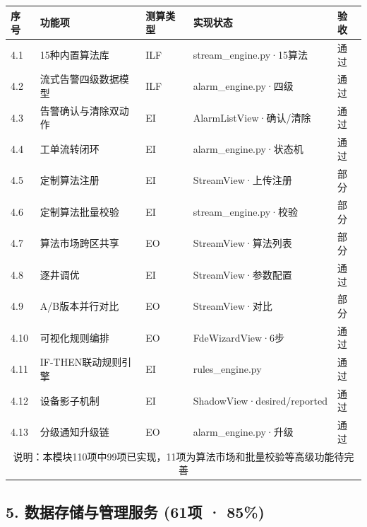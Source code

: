 \documentclass[11pt,a4paper]{ctexart}
\begin{document}
\begin{longtable}{p{1cm}p{4cm}p{3cm}p{3cm}p{2.5cm}}
\toprule
\textbf{序号} & \textbf{功能项} & \textbf{测算类型} & \textbf{实现状态} & \textbf{验收} \\
\midrule
4.1 & 15种内置算法库 & ILF & stream\_engine.py·15算法 & \color{ok}通过 \\
4.2 & 流式告警四级数据模型 & ILF & alarm\_engine.py·四级 & \color{ok}通过 \\
4.3 & 告警确认与清除双动作 & EI & AlarmListView·确认/清除 & \color{ok}通过 \\
4.4 & 工单流转闭环 & EI & alarm\_engine.py·状态机 & \color{ok}通过 \\
4.5 & 定制算法注册 & EI & StreamView·上传注册 & \color{warn}部分 \\
4.6 & 定制算法批量校验 & EI & stream\_engine.py·校验 & \color{warn}部分 \\
4.7 & 算法市场跨区共享 & EO & StreamView·算法列表 & \color{warn}部分 \\
4.8 & 逐井调优 & EI & StreamView·参数配置 & \color{ok}通过 \\
4.9 & A/B版本并行对比 & EO & StreamView·对比 & \color{warn}部分 \\
4.10 & 可视化规则编排 & EO & FdeWizardView·6步 & \color{ok}通过 \\
4.11 & IF-THEN联动规则引擎 & EI & rules\_engine.py & \color{ok}通过 \\
4.12 & 设备影子机制 & EI & ShadowView·desired/reported & \color{ok}通过 \\
4.13 & 分级通知升级链 & EO & alarm\_engine.py·升级 & \color{ok}通过 \\
\midrule
\multicolumn{5}{c}{说明：本模块110项中99项已实现，11项为算法市场和批量校验等高级功能待完善} \\
\bottomrule
\end{longtable}

\subsection{5. 数据存储与管理服务 (61项 · 85\%)}
\end{document}
